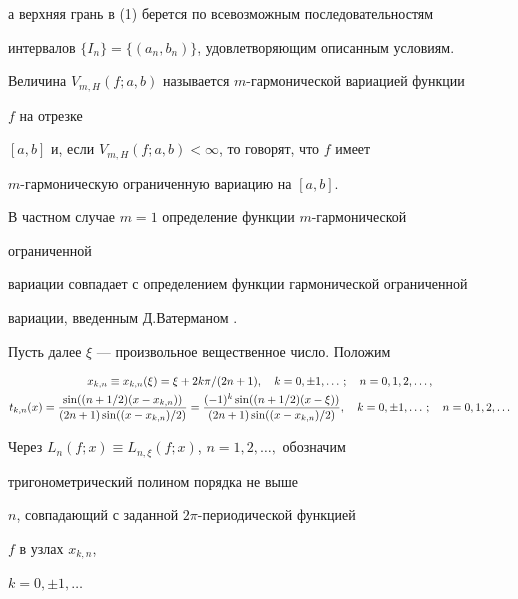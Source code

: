 а верхняя грань в (1) берется по всевозможным последовательностям


интервалов $\{I_n\}=\{(a_n,b_n)\}$, удовлетворяющим описанным условиям.





Величина $V_{m,H}(f;a,b)$ называется $m$-гармонической вариацией функции


$f$ на отрезке


$[a,b]$ и, если $V_{m,H}(f;a,b)<\infty$, то говорят, что $f$ имеет


$m$-гармоническую ограниченную вариацию на $[a,b]$.





В частном случае $m=1$ определение функции $m$-гармонической


ограниченной


вариации совпадает с определением функции гармонической ограниченной


вариации, введенным Д.Ватерманом \cite{Wat}.





Пусть далее $\xi$ --- произвольное вещественное число. Положим


\begin{gather}


x_{k,n}\equiv x_{k,n}(\xi)=\xi+2k\pi/(2n+1),\quad


k=0,\pm 1,\dotsc;\quad n=0,1,2,\dotsc,\notag\\


t_{k,n}(x)=


\frac{\sin((n+1/2)(x-x_{k,n}))}


{(2n+1)\sin((x-x_{k,n})/2)}=


\frac{(-1)^k\sin((n+1/2)(x-\xi))}


{(2n+1)\sin((x-x_{k,n})/2)},\quad k=0,\pm 1,\dotsc;\quad


n=0,1,2,\dotsc


\end{gather}





Через $L_n(f;x)\equiv L_{n,\xi}(f;x)$, $n=1,2,\dotsc,$ обозначим


тригонометрический полином порядка не выше


$n$, совпадающий с заданной $2\pi$-периодической функцией


$f$ в узлах $x_{k,n}$,


$k=0,\pm 1,\dotsc$


